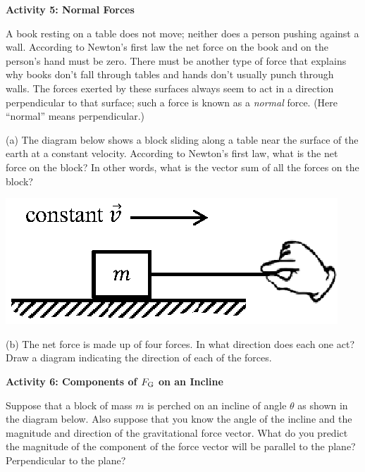 \textbf{Activity 5: Normal Forces} 

A book resting on a table does not move; neither does a person pushing against
a wall. According to Newton's first law the net force on the book and on the
person's hand must be zero. There must be another type of force
that explains why books don't fall through tables and hands don't usually punch
through walls. The forces exerted by these surfaces always seem to act in a direction perpendicular to that surface; such a force is known as a \textit{normal} force.  (Here ``normal'' means perpendicular.)


(a) The diagram below shows a block sliding along a table near the surface of
the earth at a constant velocity. According to Newton's first law, what is the
net force on the block? In other words, what is the vector sum of all the forces on the block?

\vspace{0.3cm}
\hspace{0.5in}\includegraphics{newton/newton_fig9_new.eps}
\vspace{0.3cm}

(b) The net force is made up of four forces.  
In what direction does each one act? Draw a
diagram indicating the direction of each of the forces.
\answerspace{20mm}

\pagebreak[2]
\textbf{Activity 6: Components of $F_{\rm G}$ on an Incline }

Suppose that a block of mass $m$ is perched on an incline of angle \( \theta  \)
as shown in the diagram below. Also suppose that you know the angle of the incline
and the magnitude and direction of the gravitational force vector. What do you
predict the magnitude of the component of the force vector will be parallel
to the plane? Perpendicular to the plane?


